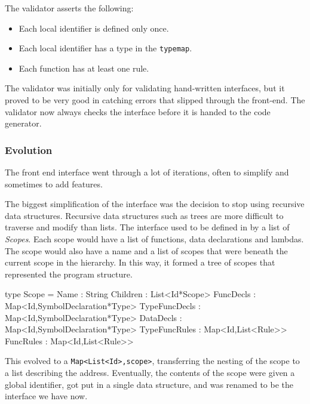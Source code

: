 The validator asserts the following:
\begin{itemize}
\item Each local identifier is defined only once.
\item Each local identifier has a type in the \texttt{typemap}.
\item Each function has at least one rule.
\end{itemize}

The validator was initially only for validating hand-written interfaces,
but it proved to be very good in catching errors that slipped through the front-end.
The validator now always checks the interface before it is handed to the code generator.

\subsubsection{Evolution}
The front end interface went through a lot of iterations, often to simplify and sometimes to add features.

The biggest simplification of the interface was the decision to stop using recursive data structures.
Recursive data structures such as trees are more difficult to traverse and modify than lists.
The interface used to be defined in by a list of \textit{Scopes}.
Each scope would have  a list of functions, data declarations and lambdas.
The scope would also have a name and a list of scopes that were beneath the current scope in the hierarchy.
In this way, it formed a tree of scopes that represented the program structure.

\begin{FS}
type Scope = {
  Name          : String
  Children      : List<Id*Scope>
  FuncDecls     : Map<Id,SymbolDeclaration*Type>
  TypeFuncDecls : Map<Id,SymbolDeclaration*Type>
  DataDecls     : Map<Id,SymbolDeclaration*Type>
  TypeFuncRules : Map<Id,List<Rule>>
  FuncRules     : Map<Id,List<Rule>>
}
\end{FS}

This evolved to a \verb|Map<List<Id>,scope>|, transferring the nesting of the scope to a list describing the address.
Eventually, the contents of the scope were given a global identifier, got put in a single data structure, and was renamed to be the interface we have now.
